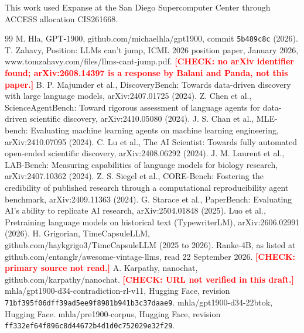 \documentclass[reprint,prx,amsmath,amssymb,aps,superscriptaddress]{revtex4-2}
\begin{document}
This work used Expanse at the San Diego Supercomputer Center through ACCESS allocation CIS261668.

\begin{thebibliography}{99}
 M. Hla, GPT-1900, github.com/michaelhla/gpt1900, commit \texttt{5b489c8c} (2026).
 T. Zahavy, Position: LLMs can't jump, ICML 2026 position paper, January 2026, www.tomzahavy.com/files/llms-cant-jump.pdf. \textbf{\textcolor{red}{[CHECK: no arXiv identifier found; arXiv:2608.14397 is a response by Balani and Panda, not this paper.]}}
 B. P. Majumder et al., DiscoveryBench: Towards data-driven discovery with large language models, arXiv:2407.01725 (2024).
 Z. Chen et al., ScienceAgentBench: Toward rigorous assessment of language agents for data-driven scientific discovery, arXiv:2410.05080 (2024).
 J. S. Chan et al., MLE-bench: Evaluating machine learning agents on machine learning engineering, arXiv:2410.07095 (2024).
 C. Lu et al., The AI Scientist: Towards fully automated open-ended scientific discovery, arXiv:2408.06292 (2024).
 J. M. Laurent et al., LAB-Bench: Measuring capabilities of language models for biology research, arXiv:2407.10362 (2024).
 Z. S. Siegel et al., CORE-Bench: Fostering the credibility of published research through a computational reproducibility agent benchmark, arXiv:2409.11363 (2024).
 G. Starace et al., PaperBench: Evaluating AI's ability to replicate AI research, arXiv:2504.01848 (2025).
 Luo et al., Pretraining language models on historical text (TypewriterLM), arXiv:2606.02991 (2026).
 H. Grigorian, TimeCapsuleLLM, github.com/haykgrigo3/TimeCapsuleLLM (2025 to 2026).
 Ranke-4B, as listed at github.com/entanglr/awesome-vintage-llms, read 22 September 2026. \textbf{\textcolor{red}{[CHECK: primary source not read.]}}
 A. Karpathy, nanochat, github.com/karpathy/nanochat. \textbf{\textcolor{red}{[CHECK: URL not verified in this draft.]}}
 mhla/gpt1900-d34-contradiction-rl-v11, Hugging Face, revision \texttt{71bf395f06dff39ad5ee9f8981b941b3c37daae9}.
 mhla/gpt1900-d34-22btok, Hugging Face.
 mhla/pre1900-corpus, Hugging Face, revision \texttt{ff332ef64f896c8d44672b4d1d0c752029e32f29}.
\end{thebibliography}
\end{document}
